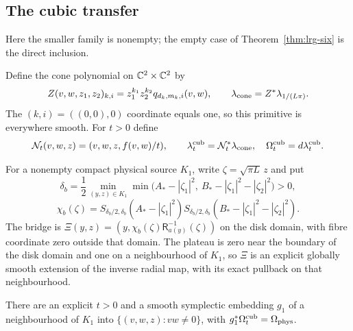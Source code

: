 \subsection{The cubic transfer}\label{sec:sxr-transport}

Here the smaller family is nonempty; the empty case of Theorem~\ref{thm:lrg-six} is the direct inclusion.

Define the cone polynomial on $\mathbb{C}^2\times\mathbb{C}^2$ by
\[
 Z(v,w,z_1,z_2)_{k,i}=z_1^{k_1}z_2^{k_2}q_{d_k,m_k,i}(v,w),
 \qquad \lambda_{\rm cone}=Z^*\lambda_{1/(L\pi)}.
\]
The $(k,i)=((0,0),0)$ coordinate equals one, so this primitive is everywhere smooth.
For $t>0$ define
\[
 \mathcal N_t(v,w,z)=(v,w,z,f(v,w)/t),\qquad
 \lambda_t^{\rm cub}=\mathcal N_t^*\lambda_{\rm cone},\quad
 \Omega_t^{\rm cub}=d\lambda_t^{\rm cub}.
\]

For a nonempty compact physical source $K_1$, write $\zeta=\sqrt{\pi L}\,z$ and put
\[
 \delta_b=\frac12\min_{(y,z)\in K_1}
   \min\bigl(A_*-|\zeta_1|^2,\ B_*-|\zeta_1|^2-|\zeta_2|^2\bigr)>0,
\]
\[
 \chi_b(\zeta)=S_{\delta_b/2,\delta_b}(A_*-|\zeta_1|^2)
 S_{\delta_b/2,\delta_b}(B_*-|\zeta_1|^2-|\zeta_2|^2).
\]
The bridge is $\Xi(y,z)=(y,\chi_b(\zeta)\mathsf R_{a(y)}^{-1}(\zeta))$ on the disk domain, with fibre
coordinate zero outside that domain. The plateau is zero near the boundary of the disk domain
and one on a neighbourhood of $K_1$, so $\Xi$ is an explicit globally smooth extension of the
inverse radial map, with its exact pullback on that neighbourhood.

\begin{proposition}\label{prop:sxr-transport}
There are an explicit $t>0$ and a smooth symplectic embedding $g_1$ of a neighbourhood of $K_1$
into $\{(v,w,z):vw\ne0\}$, with $g_1^*\Omega_t^{\rm cub}=\Omega_{\rm phys}$.
\end{proposition}

